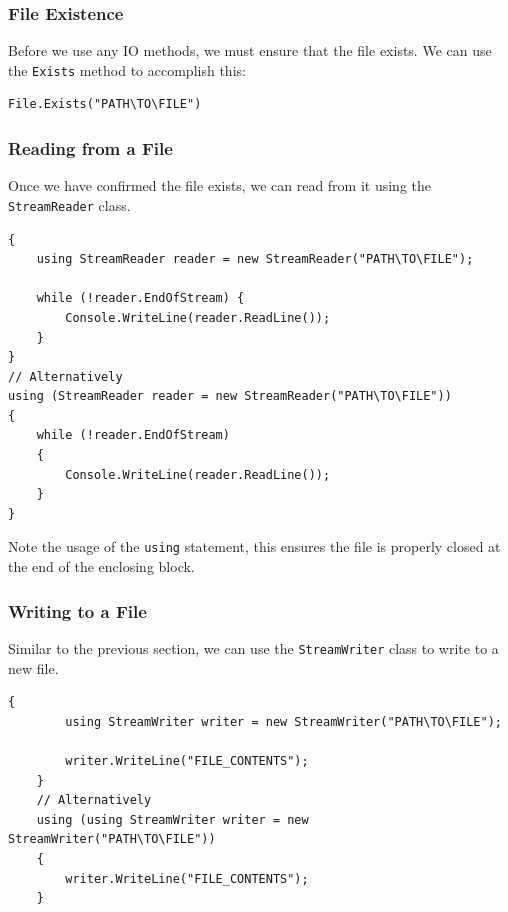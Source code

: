\documentclass{article}
\begin{document}
\subsubsection{File Existence}
Before we use any IO methods, we must ensure that the file exists. 
We can use the \lstinline{Exists} method to accomplish this:
\begin{lstlisting}[numbers=none]
File.Exists("PATH\TO\FILE")
\end{lstlisting}
\subsubsection{Reading from a File}
Once we have confirmed the file exists, we can read from it using the \lstinline{StreamReader} class.
\begin{lstlisting}[numbers=none]
{
    using StreamReader reader = new StreamReader("PATH\TO\FILE");

    while (!reader.EndOfStream) {
        Console.WriteLine(reader.ReadLine());
    }
}
// Alternatively
using (StreamReader reader = new StreamReader("PATH\TO\FILE"))
{
    while (!reader.EndOfStream)
    {
        Console.WriteLine(reader.ReadLine());
    }
}
\end{lstlisting}
Note the usage of the \lstinline{using} statement, this ensures the file is properly closed at the end 
of the enclosing block.
\subsubsection{Writing to a File}
Similar to the previous section, we can use the \lstinline{StreamWriter} class to write to a new file.
\begin{lstlisting}[numbers=none]
    {
        using StreamWriter writer = new StreamWriter("PATH\TO\FILE");

        writer.WriteLine("FILE_CONTENTS");
    }
    // Alternatively
    using (using StreamWriter writer = new StreamWriter("PATH\TO\FILE"))
    {
        writer.WriteLine("FILE_CONTENTS");
    }
\end{lstlisting}
\end{document}
